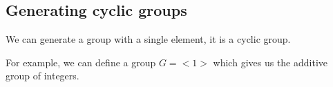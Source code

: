 
\subsection{Generating cyclic groups}

We can generate a group with a single element, it is a cyclic group.

For example, we can define a group \(G=<1>\) which gives us the additive group of integers.


